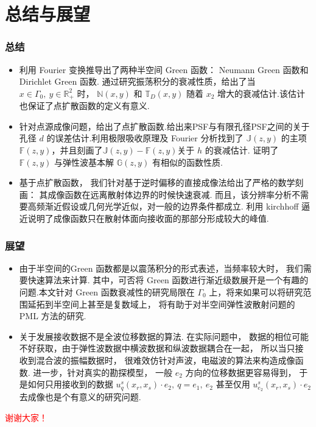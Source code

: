 \documentclass[8pt]{beamer}
\newcommand{\R}{\mathbb{R}}
\newcommand{\Ga}{\Gamma}
\newcommand{\N}{\mathbb{N}}
\newcommand{\T}{\mathbb{T}}
\renewcommand{\G}{\mathbb{G}}
\newcommand{\F}{\mathbb{F}}
\newcommand{\J}{\mathbb{J}}
\begin{document}
\section{总结与展望}
\begin{frame}
\frametitle{总结}
\begin{itemize}
\item 利用 Fourier 变换推导出了两种半空间 Green 函数： Neumann Green 函数和 Dirichlet Green 函数. 通过研究振荡积分的衰减性质，给出了当 $x\in \Ga_0, \ y\in \R^2_+$ 时， $\N(x,y)$ 和 $\T_D(x,y)$ 随着 $x_2$ 增大的衰减估计.该估计也保证了点扩散函数的定义有意义.
\vspace{.25cm}
\item 针对点源成像问题，给出了点扩散函数.给出来PSF与有限孔径PSF之间的关于孔径 $d$ 的误差估计.利用极限吸收原理及 Fourier 分析找到了 $\J(z,y)$ 的主项$\F(z,y)$，并且刻画了$\J(z,y)-\F(z,y)$关于 $h$ 的衰减估计. 证明了 $\F(z,y)$ 与弹性波基本解 $\G(z,y)$ 有相似的函数性质.
\vspace{0.25cm}
\item 基于点扩散函数， 我们针对基于逆时偏移的直接成像法给出了严格的数学刻画： 其成像函数在远离散射体边界的时候快速衰减. 而且，该分辨率分析不需要高频渐近假设或几何光学近似，对一般的边界条件都成立. 利用 kirchhoff 逼近说明了成像函数只在散射体面向接收面的那部分形成较大的峰值.
\end{itemize}
\end{frame}
\begin{frame}
\frametitle{展望}
\begin{itemize}
	\item 由于半空间的Green 函数都是以震荡积分的形式表述，当频率较大时， 我们需要快速算法来计算. 其中，可否将 Green 函数进行渐近级数展开是一个有趣的问题.本文针对 Green 函数衰减性的研究局限在 $\Ga_0$ 上，将来如果可以将研究范围延拓到半空间上甚至是复数域上， 将有助于对半空间弹性波散射问题的 PML 方法的研究.
	\vspace{.25cm}
	\item 关于发展接收数据不是全波位移数据的算法.
	在实际问题中， 数据的相位可能不好获取，由于弹性波数据中横波数据和纵波数据耦合在一起， 所以当只接收到混合波的振幅数据时， 很难效仿针对声波，电磁波的算法来构造成像函数. 进一步，针对真实的勘探模型， 一般 $e_2$ 方向的位移数据更容易得到， 于是如何只用接收到的数据 $u^s_q(x_r,x_s)\cdot e_2, \ q=e_1, \ e_2$ 甚至仅用 $u^s_{e_2}(x_r,x_s)\cdot e_2$ 去成像也是个有意义的研究问题.
\end{itemize}
\end{frame}

\begin{frame}
	\vspace{1cm}
	\centerline{\Huge \textcolor{red}{谢谢大家！}}
\end{frame}
\end{document}

